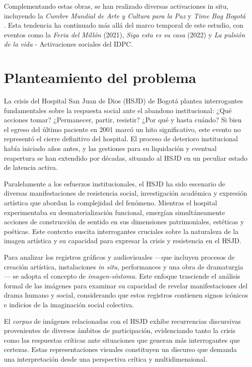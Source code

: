 Complementando estas obras, se han realizado diversas activaciones in situ, incluyendo la \textit{Cumbre Mundial de Arte y Cultura para la Paz} y \textit{Time Bag Bogotá} \parencite{IDARTES2015}. Esta tendencia ha continuado más allá del marco temporal de este estudio, con eventos como la \textit{Feria del Millón} (2021), \textit{Siga esta es su casa} (2022) y \textit{La pulsión de la vida} - Activaciones sociales del IDPC.

\section*{Planteamiento del problema}

La crisis del Hospital San Juan de Dios (HSJD) de Bogotá plantea interrogantes fundamentales sobre la respuesta social ante el abandono institucional: ¿Qué acciones tomar? ¿Permanecer, partir, resistir? ¿Por qué y hasta cuándo? Si bien el egreso del último paciente en 2001 marcó un hito significativo, este evento no representó el cierre definitivo del hospital. El proceso de deterioro institucional había iniciado años antes, y las gestiones para su liquidación y eventual reapertura se han extendido por décadas, situando al HSJD en un peculiar estado de latencia activa.

Paralelamente a los esfuerzos institucionales, el HSJD ha sido escenario de diversas manifestaciones de resistencia social, investigación académica y expresión artística que abordan la complejidad del fenómeno. Mientras el hospital experimentaba su desmaterialización funcional, emergían simultáneamente acciones de construcción de sentido en sus dimensiones patrimoniales, estéticas y poéticas. Este contexto suscita interrogantes cruciales sobre la naturaleza de la imagen artística y su capacidad para expresar la crisis y resistencia en el HSJD.

Para analizar los registros gráficos y audiovisuales —que incluyen procesos de creación artística, instalaciones \textit{in situ}, performances y una obra de dramaturgia— se adopta el concepto de \textit{imagen-síntoma}. Este enfoque trasciende el análisis formal de las imágenes para examinar su capacidad de revelar manifestaciones del drama humano y social, considerando que estos registros contienen signos icónicos e indicios de la imaginación social colectiva.

El \textit{corpus} de imágenes relacionadas con el HSJD exhibe recurrencias discursivas provenientes de diversos ámbitos de participación, evidenciando tanto la crisis como las respuestas críticas ante situaciones que generan más interrogantes que certezas. Estas representaciones visuales constituyen un discurso que demanda una interpretación desde una perspectiva crítica y multidimensional.

